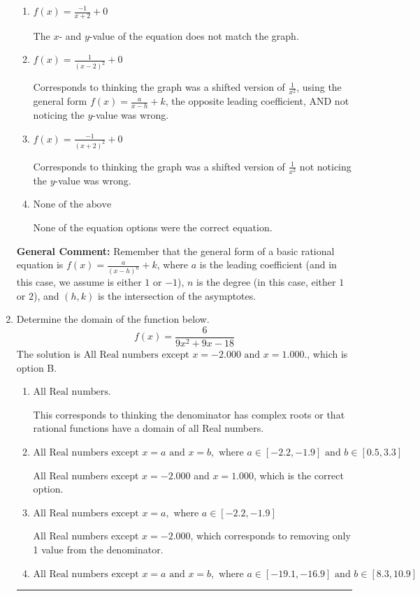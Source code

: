 \documentclass{extbook}[14pt]
\newcommand{\litem}[1]{\item #1

\rule{\textwidth}{0.4pt}}
\begin{document}
\begin{enumerate}
{\begin{enumerate}[label=\Alph*.]
Corresponds to using the general form $f(x) = \frac{a}{x-h}+k$, the opposite leading coefficient AND not noticing the $y$-value was wrong.
\item \( f(x) = \frac{-1}{x + 2} + 0 \)

The $x$- and $y$-value of the equation does not match the graph.
\item \( f(x) = \frac{1}{(x - 2)^2} + 0 \)

Corresponds to thinking the graph was a shifted version of $\frac{1}{x^2}$, using the general form $f(x) = \frac{a}{x-h}+k$, the opposite leading coefficient, AND not noticing the $y$-value was wrong.
\item \( f(x) = \frac{-1}{(x + 2)^2} + 0 \)

Corresponds to thinking the graph was a shifted version of $\frac{1}{x^2}$ not noticing the $y$-value was wrong.
\item \( \text{None of the above} \)

None of the equation options were the correct equation.
\end{enumerate}

\textbf{General Comment:} Remember that the general form of a basic rational equation is $ f(x) = \frac{a}{(x-h)^n} + k$, where $a$ is the leading coefficient (and in this case, we assume is either $1$ or $-1$), $n$ is the degree (in this case, either $1$ or $2$), and $(h, k)$ is the intersection of the asymptotes.
}
\litem{
Determine the domain of the function below.
\[ f(x) = \frac{6}{9x^{2} +9 x -18} \]The solution is \( \text{All Real numbers except } x = -2.000 \text{ and } x = 1.000. \), which is option B.\begin{enumerate}[label=\Alph*.]
\item \( \text{All Real numbers.} \)

This corresponds to thinking the denominator has complex roots or that rational functions have a domain of all Real numbers.
\item \( \text{All Real numbers except } x = a \text{ and } x = b, \text{ where } a \in [-2.2, -1.9] \text{ and } b \in [0.5, 3.3] \)

All Real numbers except $x = -2.000$ and $x = 1.000$, which is the correct option.
\item \( \text{All Real numbers except } x = a, \text{ where } a \in [-2.2, -1.9] \)

All Real numbers except $x = -2.000$, which corresponds to removing only 1 value from the denominator.
\item \( \text{All Real numbers except } x = a \text{ and } x = b, \text{ where } a \in [-19.1, -16.9] \text{ and } b \in [8.3, 10.9] \)


\end{enumerate}}
\end{enumerate}
\end{document}
